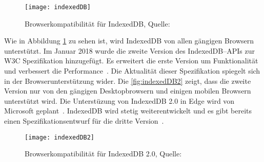 \begin{figure}[H]
	\centering
	\texttt{[image: indexedDB]}
	\grayRule
	\caption[Browserkompatibilität für IndexedDB]{Browserkompatibilität für IndexedDB, Quelle: ~\cite{caniuse-idb}}
	\label{fig:indexedDB}
\end{figure}
Wie in Abbildung \ref{fig:indexedDB} zu sehen ist, wird IndexedDB von allen gängigen Browsern unterstützt. 
%
Im Januar 2018 wurde die zweite Version des IndexedDB--\glspl{API} zur W3C Spezifikation hinzugefügt. Es erweitert die erste Version um Funktionalität und verbessert die Performance~\cite{idb2}.
Die Aktualität dieser Spezifikation spiegelt sich in der Browserunterstützung wider. Die \autoref{fig:indexedDB2} zeigt, dass die zweite Version nur von den gängigen Desktopbrowsern und einigen mobilen Browsern unterstützt wird. Die Unterstüzung von IndexedDB 2.0 in Edge wird von Microsoft geplant~\cite{edge}.
IndexedDB wird stetig weiterentwickelt und es gibt bereits einen Spezifikationsentwurf für die dritte Version~\cite{idb3}. 
\begin{figure}[H]
	\centering
	\texttt{[image: indexedDB2]}
	\grayRule
	\caption[Browserkompatibilität für IndexedDB 2.0]{Browserkompatibilität für IndexedDB 2.0, Quelle: ~\cite{caniuse-idb}}
	\label{fig:indexedDB2}
\end{figure}